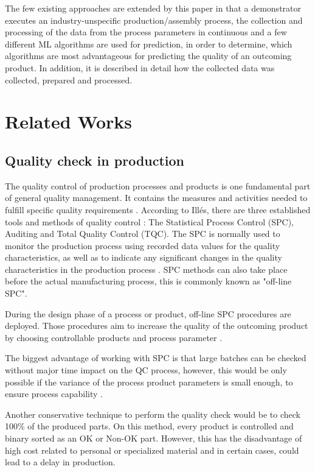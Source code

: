 \documentclass[5p,times,procedia]{elsarticle}
\begin{document}
The few existing approaches are extended by this paper in that a demonstrator executes an industry-unspecific production/assembly process,
the collection and processing of the data from the process parameters in continuous and a few different ML algorithms are used for prediction, 
in order to determine, which algorithms are most advantageous for predicting the quality of an outcoming product. 
In addition, it is described in detail how the collected data was collected, prepared and processed.

\section{Related Works} %

\subsection{Quality check in production} \label{sec:qcp} %


The quality control of production processes and products is one fundamental part of general quality management. It contains the measures and activities needed to fulfill specific quality requirements \cite{illes2017new}.
According to Illés, there are three established tools and methods of quality control \cite{illes2017new}:
The Statistical Process Control (SPC), Auditing and Total Quality Control (TQC).   
The SPC is normally used to monitor the production process using recorded data values for the quality characteristics, as well as to indicate any significant changes in the quality characteristics in the production process \cite{selvamuthu2018introduction}. SPC methods can also take place before the actual manufacturing process, this is commonly known as "off-line SPC". 

During the design phase of a process or product, off-line SPC procedures are deployed. Those procedures aim to increase the quality of the outcoming product by choosing controllable products and  process parameter \cite{mitra2016fundamentals}.

The biggest advantage of working with SPC is that large batches can be checked without major time impact on the QC process, however, this would be only possible if the variance of the process product parameters is small enough, to ensure process capability \cite{kahle2013zuverlaessigkeitsanalyse}.

Another conservative technique to perform the quality check would be to check 100\% of the produced parts. On this method, every product is controlled and binary sorted as an OK or Non-OK part. However, this has the disadvantage of high cost related to personal or specialized material and in certain cases, could lead to a delay in production.
\end{document}
